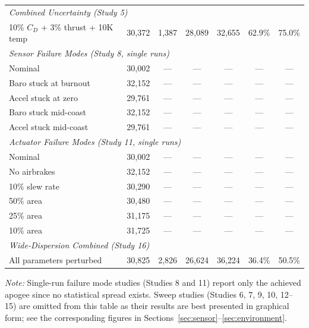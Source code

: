 \documentclass[11pt,letterpaper]{article}
\newcommand{\Cd}{C_D}
\begin{document}
\begin{longtable}{p{4.2cm}cccccc}
    \multicolumn{7}{l}{\textit{Combined Uncertainty (Study 5)}} \\
    10\% $\Cd$ + 3\% thrust + 10K temp & 30{,}372 & 1{,}387 & 28{,}089 & 32{,}655 & 62.9\% & 75.0\% \\
    \midrule

    \multicolumn{7}{l}{\textit{Sensor Failure Modes (Study 8, single runs)}} \\
    Nominal & 30{,}002 & --- & --- & --- & --- & --- \\
    Baro stuck at burnout & 32{,}152 & --- & --- & --- & --- & --- \\
    Accel stuck at zero & 29{,}761 & --- & --- & --- & --- & --- \\
    Baro stuck mid-coast & 32{,}152 & --- & --- & --- & --- & --- \\
    Accel stuck mid-coast & 29{,}761 & --- & --- & --- & --- & --- \\
    \midrule

    \multicolumn{7}{l}{\textit{Actuator Failure Modes (Study 11, single runs)}} \\
    Nominal & 30{,}002 & --- & --- & --- & --- & --- \\
    No airbrakes & 32{,}152 & --- & --- & --- & --- & --- \\
    10\% slew rate & 30{,}290 & --- & --- & --- & --- & --- \\
    50\% area & 30{,}480 & --- & --- & --- & --- & --- \\
    25\% area & 31{,}175 & --- & --- & --- & --- & --- \\
    10\% area & 31{,}725 & --- & --- & --- & --- & --- \\
    \midrule

    \multicolumn{7}{l}{\textit{Wide-Dispersion Combined (Study 16)}} \\
    All parameters perturbed & 30{,}825 & 2{,}826 & 26{,}624 & 36{,}224 & 36.4\% & 50.5\% \\
\end{longtable}

\textit{Note:} Single-run failure mode studies (Studies 8 and 11) report only the achieved apogee since no statistical spread exists. Sweep studies (Studies 6, 7, 9, 10, 12--15) are omitted from this table as their results are best presented in graphical form; see the corresponding figures in Sections~\ref{sec:sensor}--\ref{sec:environment}.
\end{document}
